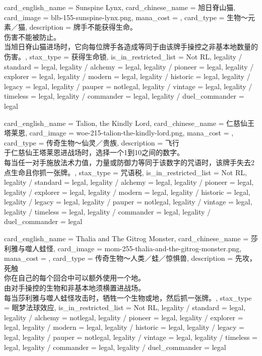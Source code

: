 \documentclass[lang = cn, color = black, 10pt]{AllThatStax}
\begin{document}
\card
{
	card_english_name = {Sunspine Lynx},
	card_chinese_name = {旭日脊山猫},
	card_image = blb-155-sunspine-lynx.png,
	mana_cost = ,
	card_type = 生物～元素／猫,
	description = {牌手不能获得生命。\\
伤害不能被防止。\\
当旭日脊山猫进场时，它向每位牌手各造成等同于由该牌手操控之非基本地数量的伤害。},
	stax_type = 获得生命锁,
	is_in_restricted_list = Not RL,
	legality / standard = legal,
	legality / alchemy = legal,
	legality / pioneer = legal,
	legality / explorer = legal,
	legality / modern = legal,
	legality / historic = legal,
	legality / legacy = legal,
	legality / pauper = notlegal,
	legality / vintage = legal,
	legality / timeless = legal,
	legality / commander = legal,
	legality / duel_commander = legal
}

\card
{
	card_english_name = {Talion, the Kindly Lord},
	card_chinese_name = {仁慈仙王塔莱恩},
	card_image = woe-215-talion-the-kindly-lord.png,
	mana_cost = ,
	card_type = 传奇生物～仙灵／贵族,
	description = {飞行\\
于仁慈仙王塔莱恩进战场时，选择一个1到10之间的数字。\\
每当任一对手施放法术力值，力量或防御力等同于该数字的咒语时，该牌手失去2点生命且你抓一张牌。},
	stax_type = 咒语税,
	is_in_restricted_list = Not RL,
	legality / standard = legal,
	legality / alchemy = legal,
	legality / pioneer = legal,
	legality / explorer = legal,
	legality / modern = legal,
	legality / historic = legal,
	legality / legacy = legal,
	legality / pauper = notlegal,
	legality / vintage = legal,
	legality / timeless = legal,
	legality / commander = legal,
	legality / duel_commander = legal
}

\card
{
	card_english_name = {Thalia and The Gitrog Monster},
	card_chinese_name = {莎利雅与噬人蛙怪},
	card_image = mom-255-thalia-and-the-gitrog-monster.png,
	mana_cost = ,
	card_type = 传奇生物～人类／蛙／惊惧兽,
	description = {先攻，死触\\
你在自己的每个回合中可以额外使用一个地。\\
由对手操控的生物和非基本地须横置进战场。\\
每当莎利雅与噬人蛙怪攻击时，牺牲一个生物或地，然后抓一张牌。},
	stax_type = 眠梦法球效应,
	is_in_restricted_list = Not RL,
	legality / standard = legal,
	legality / alchemy = notlegal,
	legality / pioneer = legal,
	legality / explorer = legal,
	legality / modern = legal,
	legality / historic = legal,
	legality / legacy = legal,
	legality / pauper = notlegal,
	legality / vintage = legal,
	legality / timeless = legal,
	legality / commander = legal,
	legality / duel_commander = legal
}
\end{document}
